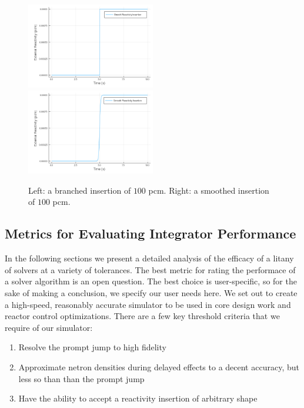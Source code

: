 \documentclass[review,onefignum,onetabnum]{siamart171218}
\begin{document}
\begin{figure}[htb]
  \includegraphics[width=0.5\textwidth]{../plots/insertion-plots/branch.png}
  \includegraphics[width=0.5\textwidth]{../plots/insertion-plots/smooth.png}
  \caption{Left: a branched insertion of $100$ pcm. Right: a smoothed insertion of $100$ pcm.}
  \label{fig:branch-smooth}
\end{figure}

\subsection{Metrics for Evaluating Integrator Performance}
In the following sections we present a detailed analysis of the efficacy of a litany of solvers
at a variety of tolerances. The best metric for rating the performace of a solver algorithm
is an open question. The best choice is user-specific, so for the sake of making a
conclusion, we specify our user needs here. We set out to create a high-speed,
reasonably accurate simulator to be used in core design work and reactor control
optimizations. There are a few key threshold criteria that we require of our simulator:\\

\begin{enumerate}
  \item Resolve the prompt jump to high fidelity %
  \item Approximate netron densities during delayed effects to a decent accuracy, but less
  so than than the prompt jump %
  \item Have the ability to accept a reactivity insertion of arbitrary shape
\end{enumerate}
\end{document}
